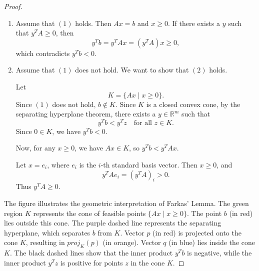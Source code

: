 \begin{proof}
  \begin{enumerate}
    \item[] Assume that \((1)\) holds. Then \(Ax = b\) and \(x \ge 0\). If there exists a \(y\) such that \(y^T A \ge 0\), then
          \[
            y^T b = y^T Ax = (y^T A)x \ge 0,
          \]
          which contradicts \(y^T b < 0\).
    \item[] Assume that \((1)\) does not hold. We want to show that \((2)\) holds.

          Let
          \[
            K = \{Ax \mid x \ge 0\}.
          \]
          Since \((1)\) does not hold, \(b \notin K\). Since \(K\) is a closed convex cone, by the separating hyperplane theorem, there exists a \(y \in \mathbb{R}^m\) such that
          \[
            y^T b < y^T z \quad \text{for all } z \in K.
          \]
          Since \(0 \in K\), we have \(y^T b < 0\).

          Now, for any \(x \ge 0\), we have \(Ax \in K\), so \(y^T b < y^T Ax\).

          Let \(x = e_i\), where \(e_i\) is the \(i\)-th standard basis vector. Then \(x \ge 0\), and
          \[
            y^T A e_i = (y^T A)_i > 0.
          \]
          Thus \(y^T A \ge 0\).
  \end{enumerate}

  \begin{center}
  \end{center}

  The figure illustrates the geometric interpretation of Farkas' Lemma. The green region $K$ represents the cone of feasible points $\{Ax \mid x \ge 0\}$. The point $b$ (in red) lies outside this cone. The purple dashed line represents the separating hyperplane, which separates $b$ from $K$. Vector $p$ (in red) is projected onto the cone $K$, resulting in $proj_K(p)$ (in orange). Vector $q$ (in blue) lies inside the cone $K$. The black dashed lines show that the inner product $y^Tb$ is negative, while the inner product $y^Tz$ is positive for points $z$ in the cone $K$.
\end{proof}

